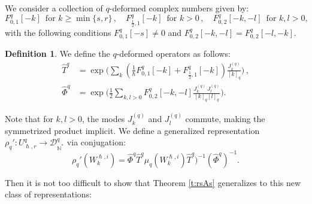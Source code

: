 \documentclass[reqno,11pt]{amsart}
\theoremstyle{plain}
\theoremstyle{definition}
\newtheorem{definition}[theorem]{Definition}
\theoremstyle{remark}
\numberwithin{equation}{section}
\newcommand{\1}{\mathds{1}}
\newcommand{\2}{\frac{1}{2}}
\begin{document}
{				{We consider} a collection of $q$-deformed  complex numbers {given by:}
				\begin{equation}\label{eq:complex}
					F^{q}_{0,1}[-k]\,\text{ for } k \geq \min \{ s, r\} \,, \quad F^{q}_{\frac{1}{2},1}[-k]\,\text{ for } k > 0\,, \quad F^{q}_{0,2}[-k,-l] \,\text{ for } k,l > 0,
				\end{equation}
				with the {following } conditions $ F^{q}_{0,1}[-s] \neq 0$ and $ F^{q}_{0,2}[-k,-l] = F^{q}_{0,2}[-l,-k]$.
				\begin{definition}
					{We define the $q$-deformed  operators as follows:
						\begin{align}\label{eq:TPhi}
							\hat{T}^q
							&=
							\exp \bigg( \sum_k \left( \frac{1}{\hslash} F^{q}_{0,1}[-k] + F^{q}_{\frac{1}{2},1}[-k] \right) \frac{J^{(q)}_k}{[k]_q}\bigg) \,,
							\\
							\hat{\Phi}^q
							&=
							\exp \bigg( \frac{1}{2} \sum_{k,l > 0} F^{q}_{0,2}[-k,-l]\frac{J^{(q)}_k\, J^{(q)}_l}{[k]_q[l]_q} \bigg).
					\end{align}}
				\end{definition}
				Note that for $k,l > 0$, the modes $J^{(q)}_k$ and $J^{(q)}_l$ commute, making the symmetrized product implicit.
				We define a generalized representation $\rho_q':  U^{q}_{\hslash, r} \to \mathcal{D}^{q}_{\mathbb{N}^*}$ via conjugation:
				\begin{equation}\label{eq:repp}
					\rho_q'( W^{\hslash,i}_k) = \hat{\Phi}^{q} \hat{T}^{q} \mu_{q}(W^{\hslash,i}_k) \hat{T}^{q})^{-1} (\hat{\Phi}^{q})^{-1}.
				\end{equation}
				
				Then it is not too difficult to show that Theorem \ref{t:rsAs} generalizes to this new class of representations:
				
}
\end{document}
